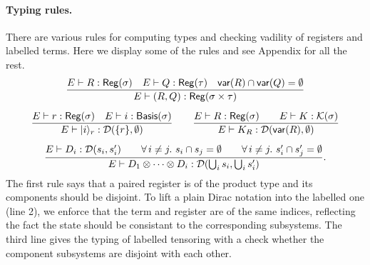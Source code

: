 \paragraph*{Typing rules.}
There are various rules for computing types and checking vadility of registers and labelled terms. Here we display some of the rules and see Appendix for all the rest.
\begin{gather*}
  \frac{
      E \vdash R : \mathsf{Reg}(\sigma) \quad
      E \vdash Q : \mathsf{Reg}(\tau)
      \quad \mathsf{var}(R) \cap \mathsf{var}(Q) = \emptyset
  }{E \vdash (R,Q) : \mathsf{Reg}(\sigma \times \tau)} \\[0.2cm]
  \frac{
          E \vdash r : \mathsf{Reg}(\sigma) \quad
          E \vdash i : \mathsf{Basis}(\sigma)}
  {E \vdash |i\rangle_r : \mathcal{D}(\{r\}, \emptyset)}
  \qquad
  \frac{E \vdash R : \mathsf{Reg}(\sigma)\qquad E \vdash K : \mathcal{K}(\sigma)}{E \vdash K_R : \mathcal{D}(\mathsf{var}(R), \emptyset)} \\[0.2cm]
    \frac{
        E \vdash D_i : \mathcal{D}(s_i,s_i') \qquad
        \forall\,i\neq j.\ s_i\cap s_j = \emptyset \qquad
        \forall\,i\neq j.\ s'_i\cap s'_j = \emptyset
    }
    {E \vdash D_1 \otimes \cdots \otimes D_i : \mathcal{D}(\bigcup_i s_i, \bigcup_i s_i')}.
\end{gather*}
The first rule says that a paired register is of the product type and its components should be disjoint.
To lift a plain Dirac notation into the labelled one (line 2), we enforce that the term and register are of the same indices, reflecting the fact the state should be consistant to the corresponding subsystems.
The third line gives the typing of labelled tensoring with a check whether the component subsystems are disjoint with each other.


